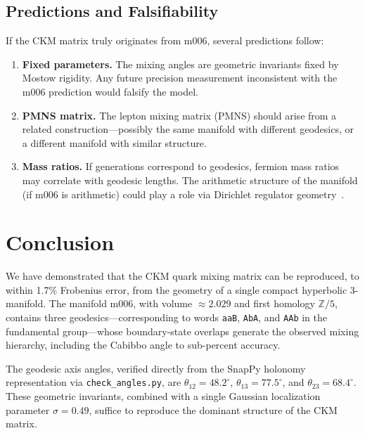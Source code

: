 \documentclass[11pt,a4paper]{article}
\begin{document}
\subsection{Predictions and Falsifiability}
\label{subsec:predictions}

If the CKM matrix truly originates from m006, several predictions follow:

\begin{enumerate}
\item \textbf{Fixed parameters.} The mixing angles are geometric 
invariants fixed by Mostow rigidity. Any future precision 
measurement inconsistent with the m006 prediction would falsify the 
model.

\item \textbf{PMNS matrix.} The lepton mixing matrix (PMNS) should 
arise from a related construction---possibly the same manifold with 
different geodesics, or a different manifold with similar structure.

\item \textbf{Mass ratios.} If generations correspond to geodesics, 
fermion mass ratios may correlate with geodesic lengths. The arithmetic 
structure of the manifold (if m006 is arithmetic) could play a role 
via Dirichlet regulator geometry~\cite{Neukirch1999}.
\end{enumerate}

\section{Conclusion}
\label{sec:conclusion}

We have demonstrated that the CKM quark mixing matrix can be reproduced, 
to within 1.7\% Frobenius error, from the geometry of a single compact 
hyperbolic 3-manifold. The manifold m006, with volume $\approx 2.029$ 
and first homology $\mathbb{Z}/5$, contains three geodesics---corresponding 
to words \texttt{aaB}, \texttt{AbA}, and \texttt{AAb} in the fundamental 
group---whose boundary-state overlaps generate the observed mixing 
hierarchy, including the Cabibbo angle to sub-percent accuracy.

The geodesic axis angles, verified directly from the SnapPy holonomy
representation via \texttt{check\_angles.py}, are
$\theta_{12} = 48.2^\circ$, $\theta_{13} = 77.5^\circ$,
and $\theta_{23} = 68.4^\circ$. These geometric invariants, combined
with a single Gaussian localization parameter $\sigma = 0.49$,
suffice to reproduce the dominant structure of the CKM matrix.
\end{document}
